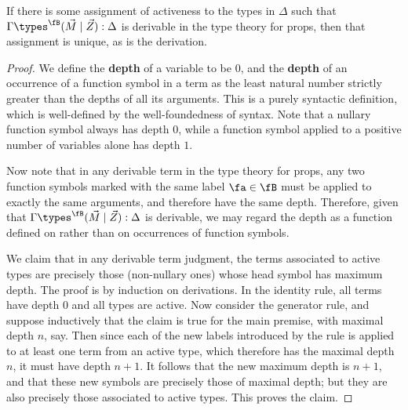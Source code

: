 \begin{thm}\label{thm:prop-tad}
  If there is some assignment of activeness to the types in $\Delta$ such that $\Gamma \types^\fB (\vec M\mid\vec Z):\Delta$ is derivable in the type theory for props, then that assignment is unique, as is the derivation.
\end{thm}
\begin{proof}
  We define the \textbf{depth} of a variable to be $0$, and the \textbf{depth} of an occurrence of a function symbol in a term as the least natural number strictly greater than the depths of all its arguments.
  This is a purely syntactic definition, which is well-defined by the well-foundedness of syntax.
  Note that a nullary function symbol always has depth $0$, while a function symbol applied to a positive number of variables alone has depth $1$.

  Now note that in any derivable term in the type theory for props, any two function symbols marked with the same label $\fa\in\fB$ must be applied to exactly the same arguments, and therefore have the same depth.
  Therefore, given that $\Gamma \types^\fB (\vec M\mid\vec Z):\Delta$ is derivable, we may regard the depth as a function defined on \fB rather than on occurrences of function symbols.

  We claim that in any derivable term judgment, the terms associated to active types are precisely those (non-nullary ones) whose head symbol has maximum depth.
  The proof is by induction on derivations.
  In the identity rule, all terms have depth $0$ and all types are active.
  Now consider the generator rule, and suppose inductively that the claim is true for the main premise, with maximal depth $n$, say.
  Then since each of the new labels introduced by the rule is applied to at least one term from an active type, which therefore has the maximal depth $n$, it must have depth $n+1$.
  It follows that the new maximum depth is $n+1$, and that these new symbols are precisely those of maximal depth; but they are also precisely those associated to active types.
  This proves the claim.


\end{proof}
